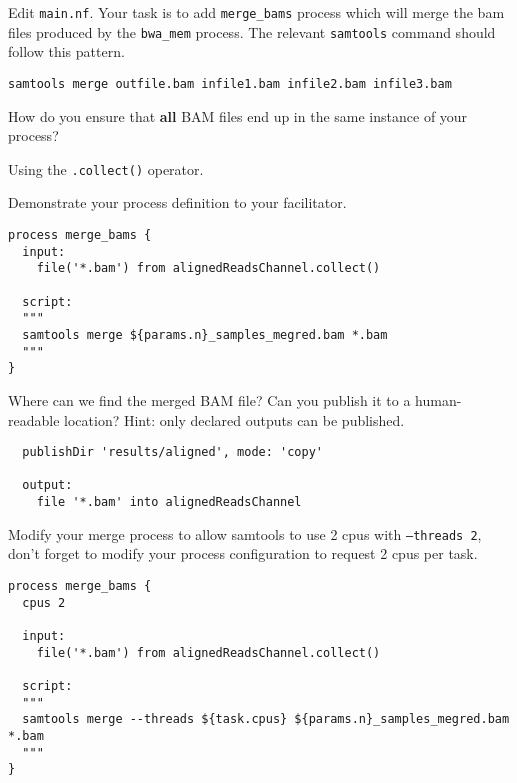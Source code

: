 \begin{bonus}

Edit \texttt{main.nf}. Your task is to add \texttt{merge\_bams} process which will merge the bam files produced by the \texttt{bwa\_mem} process. 
The relevant \texttt{samtools} command should follow this pattern.

\begin{lstlisting}
samtools merge outfile.bam infile1.bam infile2.bam infile3.bam 
\end{lstlisting}


\begin{questions}
How do you ensure that \textbf{all} BAM files end up in the same instance of your process?
\begin{answer}
Using the \texttt{.collect()} operator.
\end{answer}
Demonstrate your process definition to your facilitator.

\begin{answer}
\begin{lstlisting}
process merge_bams {
  input:
    file('*.bam') from alignedReadsChannel.collect()

  script:
  """
  samtools merge ${params.n}_samples_megred.bam *.bam
  """
}
\end{lstlisting}
\end{answer}
Where can we find the merged BAM file? Can you publish it to a human-readable location? Hint: only declared outputs can be published.
\begin{answer}
\begin{lstlisting}
  publishDir 'results/aligned', mode: 'copy'

  output:
    file '*.bam' into alignedReadsChannel
\end{lstlisting}
\end{answer}

Modify your merge process to allow samtools to use 2 cpus with \texttt{--threads 2},
don't forget to modify your process configuration to request 2 cpus per task.
\end{questions}
\begin{answer}
\begin{lstlisting}
process merge_bams {
  cpus 2

  input:
    file('*.bam') from alignedReadsChannel.collect()

  script:
  """
  samtools merge --threads ${task.cpus} ${params.n}_samples_megred.bam *.bam
  """
}
\end{lstlisting}
\end{answer}
\end{bonus}


